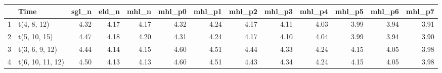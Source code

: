 \begin{table}[ht]
\centering
\begin{tabular}{rlrrrrrrrrrrr}
  \hline
 & Time & sgl\_n & eld\_n & mhl\_n & mhl\_p0 & mhl\_p1 & mhl\_p2 & mhl\_p3 & mhl\_p4 & mhl\_p5 & mhl\_p6 & mhl\_p7 \\ 
  \hline
1 & t(4, 8, 12) & 4.32 & 4.17 & 4.17 & 4.32 & 4.24 & 4.17 & 4.11 & 4.03 & 3.99 & 3.94 & 3.91 \\ 
  2 & t(5, 10, 15) & 4.47 & 4.18 & 4.20 & 4.31 & 4.24 & 4.17 & 4.10 & 4.04 & 3.99 & 3.94 & 3.90 \\ 
  3 & t(3, 6, 9, 12) & 4.44 & 4.14 & 4.15 & 4.60 & 4.51 & 4.44 & 4.33 & 4.24 & 4.15 & 4.05 & 3.98 \\ 
  4 & t(6, 10, 11, 12) & 4.50 & 4.13 & 4.13 & 4.60 & 4.51 & 4.43 & 4.34 & 4.24 & 4.15 & 4.05 & 3.98 \\ 
   \hline
\end{tabular}
\end{table}
